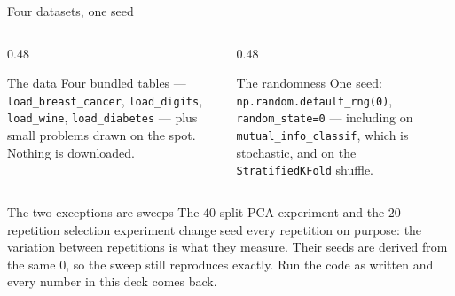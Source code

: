 \documentclass[aspectratio=169]{beamer}
\begin{document}
\begin{frame}{Four datasets, one seed}
  \begin{columns}[T]
    \begin{column}{0.48\textwidth}
      \begin{block}{The data}
        \small Four bundled tables --- \texttt{load\_breast\_cancer},
        \texttt{load\_digits}, \texttt{load\_wine},
        \texttt{load\_diabetes} --- plus small problems drawn on the spot.
        Nothing is downloaded.
      \end{block}
    \end{column}
    \begin{column}{0.48\textwidth}
      \begin{block}{The randomness}
        \small One seed: \texttt{np.random.default\_rng(0)},
        \texttt{random\_state=0} --- including on
        \texttt{mutual\_info\_classif}, which is stochastic, and on the
        \texttt{StratifiedKFold} shuffle.
      \end{block}
    \end{column}
  \end{columns}
  \begin{exampleblock}{The two exceptions are sweeps}
    \small The $40$-split PCA experiment and the $20$-repetition selection
    experiment change seed every repetition on purpose: the variation between
    repetitions is what they measure. Their seeds are derived from the same
    $0$, so the sweep still reproduces exactly. Run the code as written and
    every number in this deck comes back.
  \end{exampleblock}
\end{frame}
\end{document}
